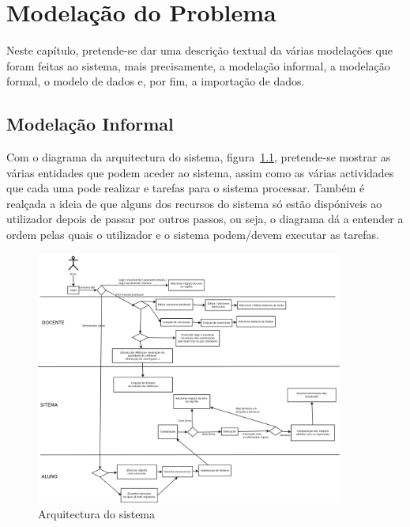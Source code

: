 \newcommand{\rarrow}{\rightarrow}
\newcommand{\larrow}{\leftarrow}
\newcommand{\unif}{\sim}
\def\prop#1#2#3{\noindent\\$\begin{array}{l} \{#1\} \\ #2 \\ \{#3\} \\ \end{array}$\\\\}

\chapter{Modelação do Problema} \label{chap modprob}

Neste capítulo, pretende-se dar uma descrição textual da várias modelações que foram feitas ao sistema, mais precisamente, a modelação informal, a modelação formal, o modelo de dados e, por fim, a importação de dados.

\section{Modelação Informal}\label{sec modinf}
Com o diagrama da arquitectura do sistema, figura~\ref{fig diaact}, pretende-se mostrar as várias entidades que podem aceder ao sistema, assim como as várias
actividades que cada uma pode realizar e tarefas para o sistema processar.
Também é realçada a ideia de que alguns dos recursos do sistema só estão dispóniveis ao utilizador depois 
de passar por outros passos, ou seja, o diagrama dá a entender a ordem pelas quais o utilizador e o sistema podem/devem executar as tarefas.\\

\begin{figure}[htbp]
\begin{center}
\includegraphics[width=0.9\textwidth]{Images/EL-PI}
\caption{Arquitectura do sistema}\label{fig diaact}
\end{center}
\end{figure}

